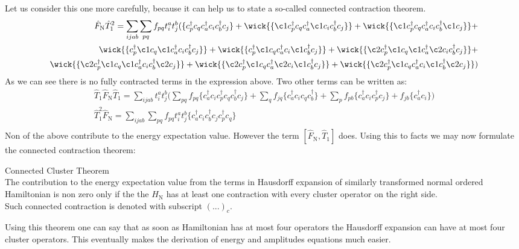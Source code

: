 \documentclass[twoside,english]{uiofysmaster}
\theoremstyle{definition}
\begin{document}
Let us consider this one more carefully, because it can help us to state a so-called connected contraction theorem.
\begin{eqnarray}
\hat{F}_\text{N}\hat{T}_1^2 = \sum_{ijab} \sum_{pq}f_{pq}t_i^at_j^b(\{c_p^\dagger c_q c_a^\dagger c_i c_b^\dagger c_j \}+ \wick{\{\c1 c_p^\dagger c_q c_a^\dagger \c1 c_i c_b^\dagger c_j \}}  +\wick{\{\c1 c_p^\dagger c_q c_a^\dagger  c_i c_b^\dagger \c1c_j \}} + \nonumber \\
\wick{\{ c_p^\dagger \c1 c_q \c1c_a^\dagger  c_i c_b^\dagger c_j \}} + \wick{\{ c_p^\dagger \c1 c_q c_a^\dagger  c_i \c1 c_b^\dagger c_j \}} + \wick{\{ \c2 c_p^\dagger  \c1 c_q \c1 c_a^\dagger \c2 c_i  c_b^\dagger  c_j \}} + \nonumber \\ \wick{\{ \c2 c_p^\dagger  \c1 c_q \c1 c_a^\dagger  c_i  c_b^\dagger \c2 c_j \}}+ \wick{\{ \c2 c_p^\dagger  \c1 c_q  c_a^\dagger \c2 c_i \c1 c_b^\dagger  c_j \}}+  \wick{\{ \c2 c_p^\dagger  \c1 c_q  c_a^\dagger  c_i \c1 c_b^\dagger \c2 c_j \}})
\end{eqnarray}
As we can see there is no fully contracted terms in the expression above. Two other terms can be written as:
\begin{align*}
\hat{T}_1\hat{F}_\text{N}\hat{T}_1= \sum_{ijab} t_i^at_j^b \bigg( \sum_{pq}f_{pq} \{c_a^\dagger c_ic_p^\dagger c_q  c_b^\dagger c_j \} +  \sum_{q}f_{jq}\{c_a^\dagger c_i  c_q  c_b^\dagger \} +  \sum_{p}f_{pb}\{c_a^\dagger c_i   c_p^\dagger c_j \} + f_{jb}\{c_a^\dagger c_i \}\bigg)\nonumber \\
\hat{T}_1^2\hat{F}_\text{N} =\sum_{ijab}  \sum_{pq}f_{pq}  t_i^at_j^b \{c_a^\dagger c_ic_b^\dagger c_j  c_p^\dagger c_q   \} \nonumber \\
\end{align*}
Non of the above contribute to the energy expectation value. However the term $[\hat{F}_\text{N},\hat{T}_1] $ does. Using this to facts we may now formulate the connected contraction theorem:
\begin{theorem} Connected Cluster Theorem \\ \label{theo:connected}
The contribution to the energy expectation value from the terms in Hausdorff expansion of similarly transformed normal ordered Hamiltonian is non zero only if the the $\hat{H}_\text{N}$ has at least one contraction with every cluster operator on the right side.\\
Such connected contraction is denoted with subscript $(...)_c$.
\end{theorem}
Using this theorem one can say that as soon as Hamiltonian has at most four operators the Hausdorff expansion can have at most four cluster operators. This eventually makes the derivation of energy and amplitudes equations much easier.\\
\end{document}
